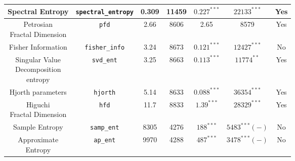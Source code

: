 \begin {table}[!h]
\begin{center}
\begin{tabular}{|c|c|c|c|c|c|c|}
  \hline
  \hline
Spectral Entropy\cite{bao_pyeeg:_2011} & \texttt{spectral\_entropy} &           
0.309 & 11459 & $0.227^{***}$ & $22133^{***}$ & Yes\\
\hline
\specialcell{Petrosian\\Fractal Dimension\cite{petrosian_kolmogorov_1995}} & \texttt{pfd} &                
2.66 & 8606 & 2.65 & 8579 & Yes\\
\hline
Fisher Information\cite{bao_pyeeg:_2011} & \texttt{fisher\_info} &                                
3.24 & 8673 & $0.121^{***}$ & $12427^{***}$ & No\\
\hline
\specialcell[l]{Singular Value \\Decomposition\\ entropy\cite{bao_pyeeg:_2011}}
& \texttt{svd\_ent} &     3.25 & 8663 & $0.113^{***}$ & $11774^{**}$ & Yes\\
 \hline
Hjorth parameters\cite{hjorth_eeg_1970} & \texttt{hjorth} &                                        
5.14 & 8633 & $0.088^{***}$ & $36354^{***}$ & Yes\\
\hline
\specialcell{Higuchi\\Fractal Dimension\cite{higuchi_approach_1988}} & \texttt{hfd} &                    
11.7 & 8833 & $1.39^{***}$ & $28329^{***}$ & Yes\\
\hline
 
Sample Entropy\cite{richman_physiological_2000} & \texttt{samp\_ent} &          
8305 & 4276 & $188^{***}$ & $5483^{***}(-)$ & No\\
\hline

\specialcell{Approximate\\Entropy\cite{richman_physiological_2000}} &
\texttt{ap\_ent} & 9970 & 4288 & $487^{***}$ & $3478^{***}(-)$ & No\\
\hline
\end{tabular}
\end{center}
\end{table}
